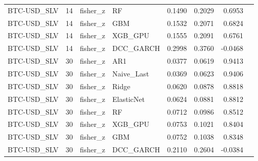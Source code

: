\begin{table}[H]
\begin{tabular}{llllrrrr}
BTC-USD_SLV & 14 & fisher_z & RF & 0.1490 & 0.2029 & 0.6953 &  \\
BTC-USD_SLV & 14 & fisher_z & GBM & 0.1532 & 0.2071 & 0.6824 &  \\
BTC-USD_SLV & 14 & fisher_z & XGB_GPU & 0.1555 & 0.2091 & 0.6761 &  \\
BTC-USD_SLV & 14 & fisher_z & DCC_GARCH & 0.2998 & 0.3760 & -0.0468 &  \\
BTC-USD_SLV & 30 & fisher_z & AR1 & 0.0377 & 0.0619 & 0.9413 &  \\
BTC-USD_SLV & 30 & fisher_z & Naive_Last & 0.0369 & 0.0623 & 0.9406 &  \\
BTC-USD_SLV & 30 & fisher_z & Ridge & 0.0620 & 0.0878 & 0.8818 &  \\
BTC-USD_SLV & 30 & fisher_z & ElasticNet & 0.0624 & 0.0881 & 0.8812 &  \\
BTC-USD_SLV & 30 & fisher_z & RF & 0.0712 & 0.0986 & 0.8512 &  \\
BTC-USD_SLV & 30 & fisher_z & XGB_GPU & 0.0753 & 0.1021 & 0.8404 &  \\
BTC-USD_SLV & 30 & fisher_z & GBM & 0.0752 & 0.1038 & 0.8348 &  \\
BTC-USD_SLV & 30 & fisher_z & DCC_GARCH & 0.2110 & 0.2604 & -0.0384 &  \\
\bottomrule
\end{tabular}
\end{table}